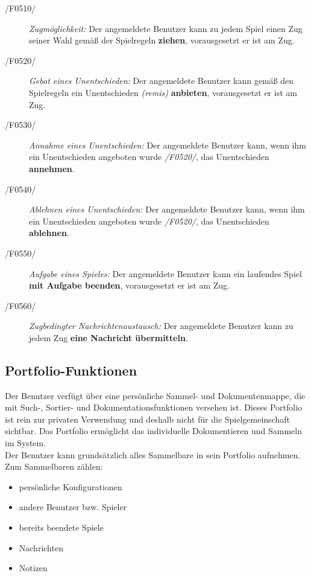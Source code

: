 \begin{description}
  \item[/F0510/]
    \textit{Zugmöglichkeit:}
    Der angemeldete Benutzer kann zu jedem Spiel einen Zug seiner Wahl gemäß der Spielregeln \textbf{ziehen}, vorausgesetzt er ist am Zug.
  \item[/F0520/]
    \textit{Gebot eines Unentschieden:}
    Der angemeldete Benutzer kann gemäß den Spielregeln ein Unentschieden \textit{(remis)} \textbf{anbieten}, vorausgesetzt er ist am Zug.
  \item[/F0530/]
    \textit{Annahme eines Unentschieden:}
    Der angemeldete Benutzer kann, wenn ihm ein Unentschieden angeboten wurde \textit{/F0520/}, das Unentschieden \textbf{annehmen}.
  \item[/F0540/]
    \textit{Ablehnen eines Unentschieden:}
    Der angemeldete Benutzer kann, wenn ihm ein Unentschieden angeboten wurde \textit{/F0520/}, das Unentschieden \textbf{ablehnen}.
  \item[/F0550/]
    \textit{Aufgabe eines Spieles:}
    Der angemeldete Benutzer kann ein laufendes Spiel \textbf{mit Aufgabe beenden}, vorausgesetzt er ist am Zug.
  \item[/F0560/]
    \textit{Zugbedingter Nachrichtenaustausch:}
    Der angemeldete Benutzer kann zu jedem Zug \textbf{eine Nachricht übermitteln}.
\end{description}

\subsection{Portfolio-Funktionen}

Der Benutzer verfügt über eine persönliche Sammel- und Dokumentenmappe,
die mit Such-, Sortier- und Dokumentationsfunktionen versehen ist.
Dieses Portfolio ist rein zur privaten Verwendung und deshalb nicht für die Spielgemeinschaft sichtbar.
Das Portfolio ermöglicht das individuelle Dokumentieren und Sammeln im System.\\
Der Benutzer kann grundsätzlich alles Sammelbare in sein Portfolio aufnehmen.\\
Zum Sammelbaren zählen:
\begin{itemize}
  \item persönliche Konfigurationen
  \item andere Benutzer bzw. Spieler
  \item bereits beendete Spiele
  \item Nachrichten
  \item Notizen
\end{itemize}


